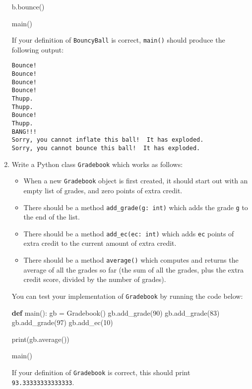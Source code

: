 \documentclass[]{article}
\newenvironment{Shaded}{}{}
\newcommand{\BuiltInTok}[1]{#1}
\newcommand{\DecValTok}[1]{\textcolor[rgb]{0.25,0.63,0.44}{#1}}
\newcommand{\KeywordTok}[1]{\textcolor[rgb]{0.00,0.44,0.13}{\textbf{#1}}}
\newcommand{\NormalTok}[1]{#1}
\newcommand{\OperatorTok}[1]{\textcolor[rgb]{0.40,0.40,0.40}{#1}}
\providecommand{\tightlist}{%
  \setlength{\itemsep}{0pt}\setlength{\parskip}{0pt}}
\begin{document}
\begin{enumerate}
\begin{Shaded}
\begin{Highlighting}[]
\NormalTok{    b.bounce()}

\NormalTok{main()}
\end{Highlighting}
\end{Shaded}

  If your definition of \texttt{BouncyBall} is correct, \texttt{main()}
  should produce the following output:

\begin{verbatim}
Bounce!
Bounce!
Bounce!
Bounce!
Thupp.
Thupp.
Bounce!
Thupp.
BANG!!!
Sorry, you cannot inflate this ball!  It has exploded.
Sorry, you cannot bounce this ball!  It has exploded.
\end{verbatim}
\item
  Write a Python class \texttt{Gradebook} which works as follows:

  \begin{itemize}
  \tightlist
  \item
    When a new \texttt{Gradebook} object is first created, it should
    start out with an empty list of grades, and zero points of extra
    credit.
  \item
    There should be a method \texttt{add\_grade(g:\ int)} which adds the
    grade \texttt{g} to the end of the list.
  \item
    There should be a method \texttt{add\_ec(ec:\ int)} which adds
    \texttt{ec} points of extra credit to the current amount of extra
    credit.
  \item
    There should be a method \texttt{average()} which computes and
    returns the average of all the grades so far (the sum of all the
    grades, plus the extra credit score, divided by the number of
    grades).
  \end{itemize}

  You can test your implementation of \texttt{Gradebook} by running the
  code below:

\begin{Shaded}
\begin{Highlighting}[]
\KeywordTok{def}\NormalTok{ main():}
\NormalTok{    gb }\OperatorTok{=}\NormalTok{ Gradebook()}
\NormalTok{    gb.add_grade(}\DecValTok{90}\NormalTok{)}
\NormalTok{    gb.add_grade(}\DecValTok{83}\NormalTok{)}
\NormalTok{    gb.add_grade(}\DecValTok{97}\NormalTok{)}
\NormalTok{    gb.add_ec(}\DecValTok{10}\NormalTok{)}

    \BuiltInTok{print}\NormalTok{(gb.average())}

\NormalTok{main()}
\end{Highlighting}
\end{Shaded}

  If your definition of \texttt{Gradebook} is correct, this should print
  \texttt{93.33333333333333}.
\end{enumerate}
\end{document}
